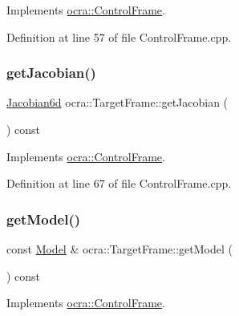 Implements \hyperlink{classocra_1_1ControlFrame_a0ceb7cd7c3fe90fa0ef311b96a6f5c88}{ocra\+::\+Control\+Frame}.



Definition at line 57 of file Control\+Frame.\+cpp.

\hypertarget{classocra_1_1TargetFrame_a94d2746633b7112afae754370a3a3e1f}{}\label{classocra_1_1TargetFrame_a94d2746633b7112afae754370a3a3e1f} 
\subsubsection{\texorpdfstring{get\+Jacobian()}{getJacobian()}}
{\footnotesize\ttfamily \hyperlink{namespaceocra_ac73b015f9f7cb0c252c4d5c4800f559a}{Jacobian6d} ocra\+::\+Target\+Frame\+::get\+Jacobian (\begin{DoxyParamCaption}{ }\end{DoxyParamCaption}) const\hspace{0.3cm}{\ttfamily [virtual]}}



Implements \hyperlink{classocra_1_1ControlFrame_a14e0b855979be5dbd360314f25191e77}{ocra\+::\+Control\+Frame}.



Definition at line 67 of file Control\+Frame.\+cpp.

\hypertarget{classocra_1_1TargetFrame_acfd238567f0cfb9e6107cd17103ec6ea}{}\label{classocra_1_1TargetFrame_acfd238567f0cfb9e6107cd17103ec6ea} 
\subsubsection{\texorpdfstring{get\+Model()}{getModel()}}
{\footnotesize\ttfamily const \hyperlink{classocra_1_1Model}{Model} \& ocra\+::\+Target\+Frame\+::get\+Model (\begin{DoxyParamCaption}{ }\end{DoxyParamCaption}) const\hspace{0.3cm}{\ttfamily [virtual]}}



Implements \hyperlink{classocra_1_1ControlFrame_ab8a1e5e3d96d7524112b4c88bf0bc5ee}{ocra\+::\+Control\+Frame}.



